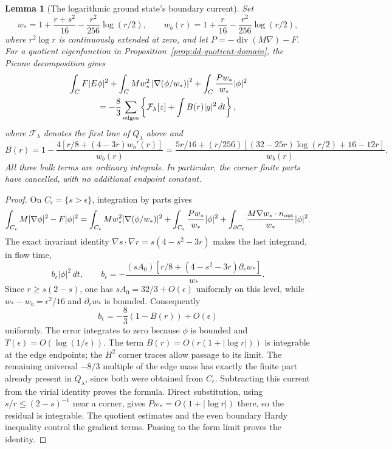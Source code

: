 \documentclass[reqno,11pt]{amsart}
\numberwithin{equation}{section}
\newtheorem{lemma}[theorem]{Lemma}
\theoremstyle{remark}
\begin{document}
\begin{lemma}[The logarithmic ground state's boundary current]\label{r4:picone-current}
Set
\[
 w_*=1+\frac{r+s^2}{16}-\frac{r^2}{256}\log(r/2),\qquad
 w_b(r)=1+\frac r{16}-\frac{r^2}{256}\log(r/2),
\]
where $r^2\log r$ is continuously extended at zero, and let
$P=-\operatorname{div}(M\nabla)-F$. For a quotient eigenfunction in
Proposition~\ref{prop:dd-quotient-domain}, the Picone decomposition gives
\begin{align}\label{r4:picone-global}
 &\int_C F|E\phi|^2
 +\int_C M w_*^2\left|\nabla(\phi/w_*)\right|^2
 +\int_C\frac{Pw_*}{w_*}|\phi|^2\\
 &\hspace{12mm}=-\frac83\sum_{\text{edges}}
       \left\{\mathcal F_\lambda[z]+\int B(r)|g|^2\,dt\right\},
\end{align}
where $\mathcal F_\lambda$ denotes the first line of $Q_\lambda$ above and
\[
 B(r)=1-\frac{4[r/8+(4-3r)w_b'(r)]}{w_b(r)}
 =\frac{5r/16+(r/256)[(32-25r)\log(r/2)+16-12r]}{w_b(r)}.
\]
All three bulk terms are ordinary integrals. In particular, the corner
finite parts have cancelled, with no additional endpoint constant.
\end{lemma}
\begin{proof}
On $C_\epsilon=\{s>\epsilon\}$, integration by parts gives
\[
 \int_{C_\epsilon}M|\nabla\phi|^2-F|\phi|^2
 =\int_{C_\epsilon}Mw_*^2|\nabla(\phi/w_*)|^2
 +\int_{C_\epsilon}\frac{Pw_*}{w_*}|\phi|^2
 +\int_{\partial C_\epsilon}
       \frac{M\nabla w_*\cdot n_{\rm out}}{w_*}|\phi|^2.
\]
The exact invariant identity $\nabla s\cdot\nabla r
=s(4-s^2-3r)$ makes the last integrand, in flow time,
\[
 b_\epsilon|\phi|^2\,dt,
 \qquad
 b_\epsilon=-\frac{(sA_0)[r/8+(4-s^2-3r)\partial_rw_*]}{w_*}.
\]
Since $r\ge s(2-s)$, one has
$sA_0=32/3+O(\epsilon)$ uniformly on this level, while
$w_*-w_b=\epsilon^2/16$ and $\partial_rw_*$ is bounded. Consequently
\[
 b_\epsilon=-\frac83(1-B(r))+O(\epsilon)
\]
uniformly. The error integrates to zero because $\phi$ is bounded and
$T(\epsilon)=O(\log(1/\epsilon))$.
The term $B(r)=O(r(1+|\log r|))$ is integrable at the edge endpoints;
the $H^2$ corner traces allow passage to its limit. The remaining universal
$-8/3$ multiple of the edge mass has exactly the finite part already
present in $Q_\lambda$, since both were obtained from $C_\epsilon$.
Subtracting this current from the virial identity proves the formula.
Direct substitution, using $s/r\le (2-s)^{-1}$ near a corner,
gives $Pw_*=O(1+|\log r|)$ there, so the residual is integrable.
The quotient estimates and the even boundary Hardy inequality control
the gradient terms. Passing to the form limit proves the identity.
\end{proof}
\end{document}
